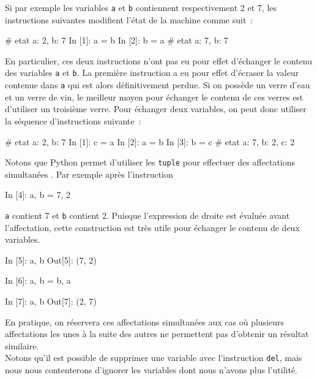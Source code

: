 \documentclass{magnolia}
\begin{document}
Si par exemple les variables \verb_a_ et \verb_b_ contiennent respectivement 2 et 7, les
instructions suivantes modifient l'état de la machine comme suit~:

\begin{pythoncode}
# etat {a: 2, b: 7}
In [1]: a = b
In [2]: b = a
# etat {a: 7, b: 7} 
\end{pythoncode}

\noindent En particulier, ces deux instructions n'ont pas eu pour effet d'échanger le contenu
des variables \verb_a_ et \verb_b_. La première instruction a eu pour effet d'écraser la
valeur contenue dans \verb_a_ qui est alors définitivement perdue. Si on possède un verre
d'eau et un verre de vin, le meilleur moyen pour échanger le contenu de ces verres est
d'utiliser un troisième verre. Pour échanger deux variables, on peut donc utiliser la séquence
d'instructions suivante~:

\begin{pythoncode}
# etat {a: 2, b: 7}
In [1]: c = a
In [2]: a = b
In [3]: b = c
# etat {a: 7, b: 2, c: 2}
\end{pythoncode}



Notons que Python permet d'utiliser les \verb_tuple_ pour effectuer des affectations
\og simultanées \fg. Par exemple après l'instruction
\begin{pythoncode}
In [4]: a, b = 7, 2
\end{pythoncode}
\verb!a! contient 7 et \verb!b! contient 2.
Puisque l'expression de droite est évaluée avant l'affectation, cette construction est
très utile pour échanger le contenu de deux variables.
\begin{pythoncode}
In [5]: a, b
Out[5]: (7, 2)

In [6]: a, b = b, a

In [7]: a, b
Out[7]: (2, 7)
\end{pythoncode}
En pratique, on réservera ces affectations simultanées aux cas où plusieurs affectations
les unes à la suite des autres ne permettent pas d'obtenir un résultat similaire.\\

Notons qu'il est possible de supprimer une variable avec l'instruction \verb_del_, mais
nous nous contenterons d'ignorer les variables dont nous n'avons plus l'utilité.\\
\end{document}
